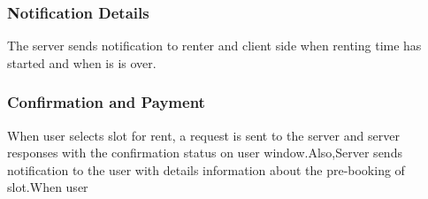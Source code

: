 \documentclass[12pt, english]{article}
\begin{document}
\subsubsection{Notification Details}
The server sends notification to renter and client side when renting time has started and when is is over. \subsubsection{Confirmation and Payment}
When user selects slot for rent, a request is sent to the server and server responses with the confirmation status on user window.Also,Server sends notification to the user with details information about the pre-booking of slot.When user 

\begin{figure}[h!]
    \centering
    \begin{subfigure}[t]{0.4\textwidth}

\end{subfigure}
\end{figure}
\end{document}
